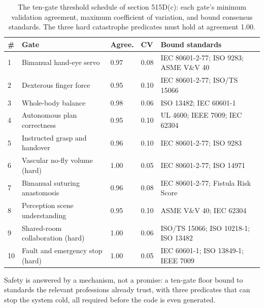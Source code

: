 \begin{table}[H]
\footnotesize
\begin{tabularx}{\textwidth}{@{}L{0.6cm} L{3.5cm} C{1.5cm} C{1.0cm} Y@{}}
\toprule
\textbf{\#} & \textbf{Gate} & \textbf{Agree.} & \textbf{CV} & \textbf{Bound standards}\\
 & Bimanual hand-eye servo & 0.97 & 0.08 & IEC 80601-2-77; ISO 9283; ASME V\&V 40\\
2 & Dexterous finger force & 0.95 & 0.10 & IEC 80601-2-77; ISO/TS 15066\\
3 & Whole-body balance & 0.98 & 0.06 & ISO 13482; IEC 60601-1\\
4 & Autonomous plan correctness & 0.95 & 0.10 & UL 4600; IEEE 7009; IEC 62304\\
5 & Instructed grasp and handover & 0.96 & 0.10 & IEC 80601-2-77; ISO 9283\\
6 & Vascular no-fly volume (hard) & 1.00 & 0.05 & IEC 80601-2-77; ISO 14971\\
7 & Bimanual suturing anastomosis & 0.96 & 0.08 & IEC 80601-2-77; Fistula Risk Score\\
8 & Perception scene understanding & 0.95 & 0.10 & ASME V\&V 40; IEC 62304\\
9 & Shared-room collaboration (hard) & 1.00 & 0.06 & ISO/TS 15066; ISO 10218-1; ISO 13482\\
10 & Fault and emergency stop (hard) & 1.00 & 0.05 & IEC 60601-1; ISO 13849-1; IEEE 7009\\
\bottomrule
\end{tabularx}
\caption{The ten-gate threshold schedule of section 515D(c): each gate's minimum
validation agreement, maximum coefficient of variation, and bound consensus
standards. The three hard catastrophe predicates must hold at agreement 1.00.}
\label{tab:gates}
\end{table}

Safety is answered by a mechanism, not a promise: a ten-gate floor bound to standards
the relevant professions already trust, with three predicates that can stop the
system cold, all required before the code is even generated.
